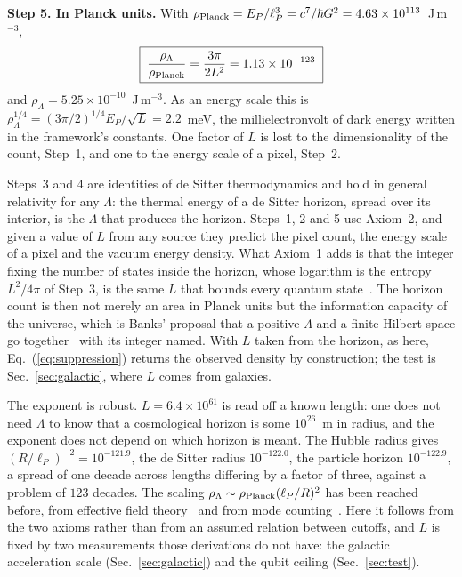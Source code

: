 \documentclass[aps,prd,twocolumn,superscriptaddress,nofootinbib,showkeys]{revtex4-2}
\begin{document}
\textbf{Step 5. In Planck units.} With $\rho_{\rm Planck} = E_P/\ell_P^3 = c^7/\hbar G^2 = 4.63\times10^{113}$~J\,m$^{-3}$,
\begin{equation}
\boxed{\;\frac{\rho_\Lambda}{\rho_{\rm Planck}} = \frac{3\pi}{2L^2} = 1.13\times10^{-123}\;}
\label{eq:suppression}
\end{equation}
and $\rho_\Lambda = 5.25\times10^{-10}$~J\,m$^{-3}$. As an energy scale this is $\rho_\Lambda^{1/4} = (3\pi/2)^{1/4}E_P/\sqrt{L} = 2.2$~meV, the millielectronvolt of dark energy written in the framework's constants. One factor of $L$ is lost to the dimensionality of the count, Step~1, and one to the energy scale of a pixel, Step~2.

Steps~3 and 4 are identities of de Sitter thermodynamics and hold in general relativity for any $\Lambda$: the thermal energy of a de Sitter horizon, spread over its interior, is the $\Lambda$ that produces the horizon. Steps~1, 2 and 5 use Axiom~2, and given a value of $L$ from any source they predict the pixel count, the energy scale of a pixel and the vacuum energy density. What Axiom~1 adds is that the integer fixing the number of states inside the horizon, whose logarithm is the entropy $L^2/4\pi$ of Step~3, is the same $L$ that bounds every quantum state~\cite{korytko2026c}. The horizon count is then not merely an area in Planck units but the information capacity of the universe, which is Banks' proposal that a positive $\Lambda$ and a finite Hilbert space go together~\cite{banks2000} with its integer named. With $L$ taken from the horizon, as here, Eq.~(\ref{eq:suppression}) returns the observed density by construction; the test is Sec.~\ref{sec:galactic}, where $L$ comes from galaxies.

The exponent is robust. $L = 6.4\times10^{61}$ is read off a known length: one does not need $\Lambda$ to know that a cosmological horizon is some $10^{26}$~m in radius, and the exponent does not depend on which horizon is meant. The Hubble radius gives $(R/\ell_P)^{-2}=10^{-121.9}$, the de Sitter radius $10^{-122.0}$, the particle horizon $10^{-122.9}$, a spread of one decade across lengths differing by a factor of three, against a problem of $123$ decades. The scaling $\rho_\Lambda\sim\rho_{\rm Planck}(\ell_P/R)^2$ has been reached before, from effective field theory~\cite{ckn1999} and from mode counting~\cite{gurzadyan2003,padmanabhan2005,hpadmanabhan2013}. Here it follows from the two axioms rather than from an assumed relation between cutoffs, and $L$ is fixed by two measurements those derivations do not have: the galactic acceleration scale (Sec.~\ref{sec:galactic}) and the qubit ceiling (Sec.~\ref{sec:test}).
\end{document}
